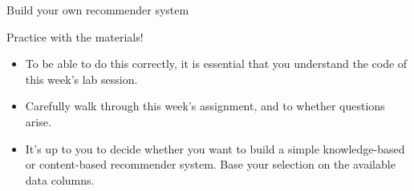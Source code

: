 \begin{frame}{Build your own recommender system}
	\begin{exampleblock}{Practice with the materials!}
		\begin{itemize}
			\item <3-> To be able to do this correctly, it is essential that you understand the code of this week's lab session. 
			\item <4-> Carefully walk through this week's assignment, and to whether questions arise.
			\item <5-> It's up to you to decide whether you want to build a simple knowledge-based or content-based recommender system. Base your selection on the available data columns.
		\end{itemize}
	\end{exampleblock}
\end{frame}